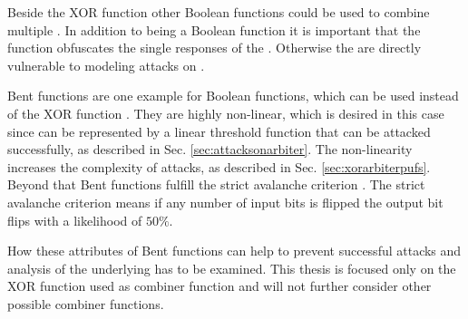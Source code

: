 Beside the \ac{XOR} function other Boolean functions could be used to combine multiple \apuf.
In addition to being a Boolean function it is important that the function obfuscates the single responses of the \apufs. Otherwise the \apufs are directly vulnerable to modeling attacks on \apufs.

Bent functions are one example for Boolean functions, which can be used instead of the \ac{XOR} function \cite{2016BentFunction}.
They are highly non-linear, which is desired in this case since \apufs can be represented by a linear threshold function that can be attacked successfully, as described in Sec. \ref{sec:attacksonarbiter}.
The non-linearity increases the complexity of attacks, as described in Sec. \ref{sec:xorarbiterpufs}. %
Beyond that Bent functions fulfill the strict avalanche criterion \cite{2016AvalancheEffect}.
The strict avalanche criterion means if any number of input bits is flipped the output bit flips with a likelihood of $50 \%$.

How these attributes of Bent functions can help to prevent successful attacks and analysis of the underlying \apufs has to be examined.
This thesis is focused only on the \ac{XOR} function used as combiner function and will not further consider other possible combiner functions.

